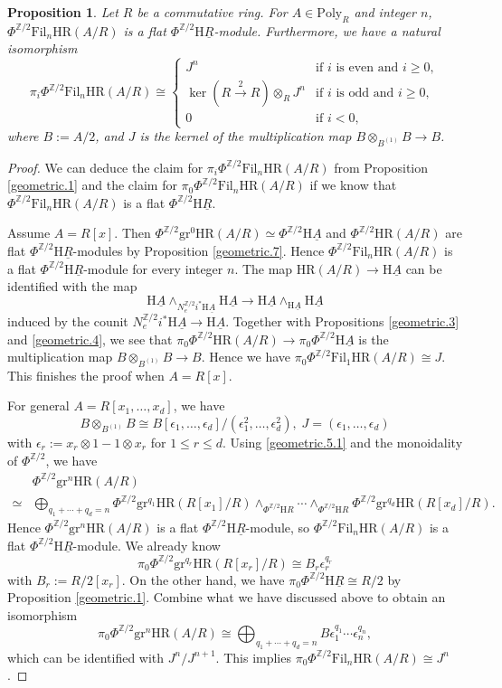 \documentclass[10pt]{amsart}
\newtheorem{prop}[thm]{Proposition}
\theoremstyle{definition}
\numberwithin{equation}{section}
\newcommand{\Z}{\mathbb{Z}}
\newcommand{\rH}{\mathrm{H}}
\newcommand{\ul}{\underline}
\newcommand{\Poly}{\mathrm{Poly}}
\newcommand{\gr}{\mathrm{gr}}
\newcommand{\Fil}{\mathrm{Fil}}
\newcommand{\HR}{\mathrm{HR}}
\begin{document}
{\begin{prop}
\label{geometric.5}
Let $R$ be a commutative ring.
For $A\in \Poly_R$ and integer $n$,
$\Phi^{\Z/2} \Fil_n \HR(A/R)$ is a flat $\Phi^{\Z/2}\rH \ul{R}$-module.
Furthermore,
we have a natural isomorphism
\[
\pi_i\Phi^{\Z/2}\Fil_n \HR(A/R)
\cong
\left\{
\begin{array}{ll}
J^n & \text{if $i$ is even and $i\geq 0$},\\
\ker(R\xrightarrow{2} R)\otimes_R J^n & \text{if $i$ is odd and $i\geq 0$},
\\
0 &\text{if $i<0$},
\end{array}
\right.
\]
where $B:=A/2$, and $J$ is the kernel of the multiplication map $B\otimes_{B^{(1)}}B\to B$.
\end{prop}
\begin{proof}
We can deduce the claim for $\pi_i \Phi^{\Z/2}\Fil_n\HR(A/R)$ from Proposition \ref{geometric.1} and the claim for $\pi_0 \Phi^{\Z/2}\Fil_n \HR(A/R)$ if we know that $\Phi^{\Z/2}\Fil_n \HR(A/R)$ is a flat $\Phi^{\Z/2}\rH \ul{R}$.

Assume $A=R[x]$.
Then $\Phi^{\Z/2} \gr^0 \HR(A/R)\simeq \Phi^{\Z/2} \rH \ul{A}$ and $\Phi^{\Z/2} \HR(A/R)$ are flat $\Phi^{\Z/2} \rH \ul{R}$-modules by Proposition \ref{geometric.7}.
Hence $\Phi^{\Z/2} \Fil_n \HR(A/R)$ is a flat $\Phi^{\Z/2}\rH \ul{R}$-module for every integer $n$.
The map
$\HR(A/R)\to \rH \ul{A}$ can be identified with the map
\[
\rH \ul{A}\wedge_{N_e^{\Z/2}i^*\rH \ul{A}}\rH \ul{A}
\to
\rH \ul{A}\wedge_{\rH \ul{A}}\rH \ul{A}
\]
induced by the counit $N_e^{\Z/2}i^* \rH \ul{A}\to \rH \ul{A}$.
Together with Propositions \ref{geometric.3} and \ref{geometric.4},
we see that $\pi_0\Phi^{\Z/2}\HR(A/R)\to \pi_0\Phi^{\Z/2}\rH \ul{A}$ is the multiplication map $B\otimes_{B^{(1)}}B\to B$.
Hence we have $\pi_0\Phi^{\Z/2}\Fil_1\HR(A/R)\cong J$.
This finishes the proof when $A=R[x]$.

For general $A=R[x_1,\ldots,x_d]$,
we have
\[
B\otimes_{B^{(1)}}B
\cong
B[\epsilon_1,\ldots,\epsilon_d]/(\epsilon_1^2,\ldots,\epsilon_d^2),
\;
J=(\epsilon_1,\ldots,\epsilon_d)
\]
with $\epsilon_r:=x_r\otimes 1-1\otimes x_r$ for $1\leq r\leq d$.
Using \eqref{geometric.5.1} and the monoidality of $\Phi^{\Z/2}$,
we have
\begin{align*}
& \Phi^{\Z/2} \gr^n \HR(A/R)
\\
\simeq &
\bigoplus_{q_1+\cdots+q_d=n}
\Phi^{\Z/2}\gr^{q_1}\HR(R[x_1]/R)\wedge_{\Phi^{\Z/2}\rH R} \cdots \wedge_{\Phi^{\Z/2} \rH R} \Phi^{\Z/2}\gr^{q_d}\HR(R[x_d]/R).
\end{align*}
Hence $\Phi^{\Z/2} \gr^n \HR(A/R)$ is a flat $\Phi^{\Z/2}\rH \ul{R}$-module,
so $\Phi^{\Z/2}\Fil_n \HR(A/R)$ is a flat $\Phi^{\Z/2}\rH \ul{R}$-module.
We already know
\[
\pi_0\Phi^{\Z/2}\gr^{q_r} \HR(R[x_r]/R)
\cong
B_r\epsilon_r^{q_r}
\]
with $B_r:=R/2[x_r]$.
On the other hand,
we have $\pi_0\Phi^{\Z/2}\rH \ul{R}\cong R/2$ by Proposition \ref{geometric.1}.
Combine what we have discussed above to obtain an isomorphism
\[
\pi_0 \Phi^{\Z/2} \gr^n \HR(A/R)
\cong
\bigoplus_{q_1+\cdots+q_d=n}
B \epsilon_1^{q_1} \cdots \epsilon_n^{q_n},
\]
which can be identified with $J^n/J^{n+1}$.
This implies $\pi_0\Phi^{\Z/2}\Fil_n \HR(A/R)
\cong J^n$.
\end{proof}

}
\end{document}
